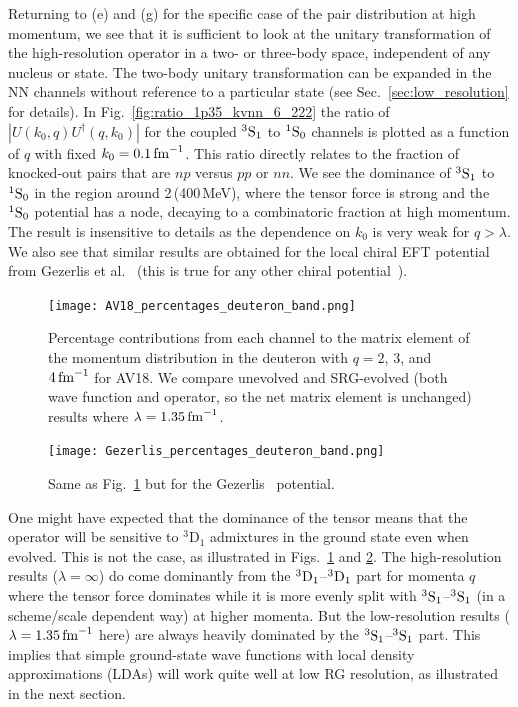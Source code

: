 \documentclass[10pt,aps,prc,floatfix,twocolumn,nofootinbib]{revtex4-1}
\begin{document}
Returning to (e) and (g) for the specific case of the pair distribution at high momentum, we see that it is sufficient to look at the unitary transformation of the high-resolution operator in a two- or three-body space, independent of any nucleus or state.
The two-body unitary transformation can be expanded in the NN channels without reference to a particular state (see Sec.~\ref{sec:low_resolution} for details).
In Fig.~\ref{fig:ratio_1p35_kvnn_6_222} the ratio of
$|U(k_0,q)U^\dagger(q,k_0)|$ for the coupled $^3\mbox{S}_1$ to $^1\mbox{S}_0$ channels  is plotted as a function of $q$ with fixed $k_0 = 0.1\,\mbox{fm}^{-1}$.
This ratio directly relates to the fraction of knocked-out pairs that are $np$ versus $pp$ or $nn$.
We see the dominance of $^3\mbox{S}_1$ to $^1\mbox{S}_0$ in the region around 2\,\fmi (400\,MeV), where the tensor force is strong and the $^1\mbox{S}_0$ potential has a node, decaying to a combinatoric fraction at high momentum.
The result is insensitive to details as the dependence on $k_0$ is very weak for $q > \lambda$.
We also see that similar results are obtained for the local chiral EFT potential from Gezerlis et al.~\cite{Gezerlis:2014zia} (this is true for any other chiral potential~\cite{Tropiano:2021prep}).

\begin{figure}[tbh]
  \centering
  \texttt{[image: AV18\_percentages\_deuteron\_band.png]}
  \caption{Percentage contributions from each channel to the matrix element
  of the momentum distribution in the deuteron with $q=2$, $3$, and $4\,\mbox{fm}^{-1}$ for AV18. We compare unevolved and SRG-evolved (both wave function and operator, so the net matrix element is unchanged) results where $\lambda=1.35\,\mbox{fm}^{-1}$.}
  \label{fig:barcharts_AV18}
\end{figure}

\begin{figure}[tbh]
  \centering
  \texttt{[image: Gezerlis\_percentages\_deuteron\_band.png]}
  \caption{Same as Fig.~\ref{fig:barcharts_AV18} but for the Gezerlis \NNLO\ potential.}
  \label{fig:barcharts_Gezerlis}
\end{figure}

One might have expected that the dominance of the tensor means that the operator will be sensitive to $^3\mbox{D}_1$ admixtures in the ground state even when evolved.
This is not the case, as illustrated in Figs.~\ref{fig:barcharts_AV18} and \ref{fig:barcharts_Gezerlis}. 
The high-resolution results ($\lambda = \infty$) do come dominantly from the $^3\mbox{D}_1$--$^3\mbox{D}_1$ part for momenta $q$ where the tensor force dominates while it is more evenly split with $^3\mbox{S}_1$--$^3\mbox{S}_1$ (in a scheme/scale dependent way) at higher momenta.
But the low-resolution results ($\lambda = 1.35\,\mbox{fm}^{-1}$ here) are always heavily dominated by the $^3\mbox{S}_1$--$^3\mbox{S}_1$ part.
This implies that simple ground-state wave functions with local density approximations (LDAs) will work quite well at low RG resolution, as illustrated in the next section.
\end{document}
